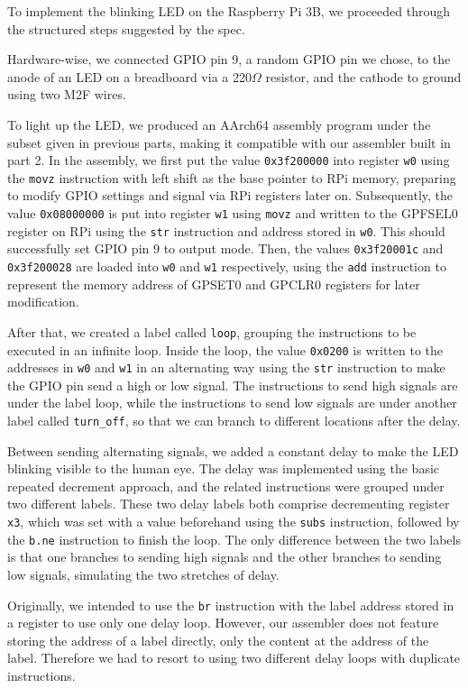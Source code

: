 \documentclass[9pt,a4paper]{article}
\begin{document}
To implement the blinking LED on the Raspberry Pi 3B, we proceeded through the structured steps suggested by the spec.

Hardware-wise, we connected GPIO pin 9, a random GPIO pin we chose, to the anode of an LED on a breadboard via a 220$\Omega$ resistor, and the cathode to ground using two M2F wires.

To light up the LED, we produced an AArch64 assembly program under the subset given in previous parts, making it compatible with our assembler built in part 2.
In the assembly, we first put the value \verb|0x3f200000| into register \verb|w0| using the \verb|movz| instruction with left shift as the base pointer to RPi memory, preparing to modify GPIO settings and signal via RPi registers later on.
Subsequently, the value \verb|0x08000000| is put into register \verb|w1| using \verb|movz| and written to the GPFSEL0 register on RPi using the \verb|str| instruction and address stored in \verb|w0|. This should successfully set GPIO pin 9 to output mode.
Then, the values \verb|0x3f20001c| and \verb|0x3f200028| are loaded into \verb|w0| and \verb|w1| respectively, using the \verb|add| instruction to represent the memory address of GPSET0 and GPCLR0 registers for later modification.

After that, we created a label called \verb|loop|, grouping the instructions to be executed in an infinite loop.
Inside the loop, the value \verb|0x0200| is written to the addresses in \verb|w0| and \verb|w1| in an alternating way using the \verb|str| instruction to make the GPIO pin send a high or low signal.
The instructions to send high signals are under the label loop, while the instructions to send low signals are under another label called \verb|turn_off|, so that we can branch to different locations after the delay.

Between sending alternating signals, we added a constant delay to make the LED blinking visible to the human eye.
The delay was implemented using the basic repeated decrement approach, and the related instructions were grouped under two different labels.
These two delay labels both comprise decrementing register \verb|x3|, which was set with a value beforehand using the \verb|subs| instruction, followed by the \verb|b.ne| instruction to finish the loop.
The only difference between the two labels is that one branches to sending high signals and the other branches to sending low signals, simulating the two stretches of delay.

Originally, we intended to use the \verb|br| instruction with the label address stored in a register to use only one delay loop.
However, our assembler does not feature storing the address of a label directly, only the content at the address of the label.
Therefore we had to resort to using two different delay loops with duplicate instructions.
\end{document}

